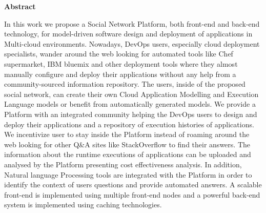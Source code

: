 \thispagestyle{empty}
\begin{titlepage}
\begin{center}
{\bf\Large Abstract}\\
\end{center}

\indent In this work we propose a Social Network Platform, both front-end and back-end technology, for model-driven software design and deployment of applications in Multi-cloud environments. Nowadays, DevOps users, especially cloud deployment specialists, wander around the web looking for automated tools like Chef supermarket, IBM bluemix and other deployment tools where they almost manually configure and deploy their applications without any help from a community-sourced information repository. The users, inside of the proposed social network, can create their own Cloud Application Modelling and Execution
Language models or benefit from automatically generated models. We provide a Platform with an integrated community helping the DevOps users to design and deploy their applications and a repository of execution histories of applications. We incentivize user to stay inside the Platform instead of roaming around the web looking for other Q\&A sites like StackOverflow to find their answers. The information about the runtime executions of applications can be uploaded and analysed by the Platform presenting cost effectiveness analysis. In addition, Natural language Processing tools are integrated with the Platform in order to identify the context of users questions and provide automated answers. A scalable front-end is implemented using multiple front-end nodes and a powerful back-end system is implemented using caching technologies. 


\vfill
\end{titlepage}

